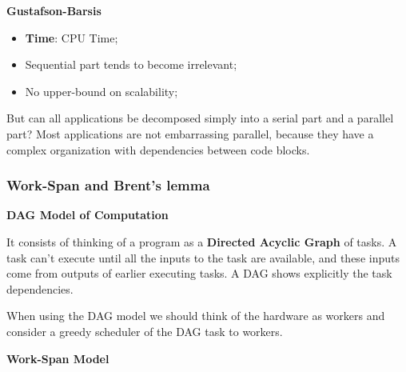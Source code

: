 \begin{minipage}[t]{0.5\textwidth}
    \par {\large \textbf{Gustafson-Barsis}}
    \begin{itemize}
        \item \textbf{Time}: CPU Time;
        \item Sequential part tends to become irrelevant;
        \item No upper-bound on scalability;
    \end{itemize}
\end{minipage}
\par But can all applications be decomposed simply into a serial part and a parallel part? Most applications are not embarrassing parallel, because they have a complex organization with dependencies between code blocks.
\subsubsection{Work-Span and Brent's lemma}
\par {\large \textbf{DAG Model of Computation}}
\par It consists of thinking of a program as a \textbf{Directed Acyclic Graph} of tasks. A task can't execute until all the inputs to the task are available, and these inputs come from outputs of earlier executing tasks. A DAG shows explicitly the task dependencies.
\par When using the DAG model we should think of the hardware as workers and consider a greedy scheduler of the DAG task to workers.
\par {\Large \textbf{Work-Span Model}}
